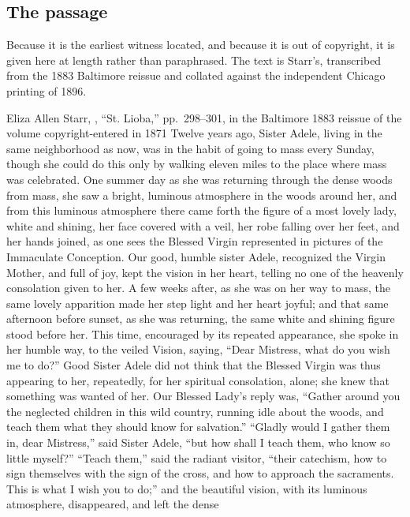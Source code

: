 \subsection{The passage}

Because it is the earliest witness located, and because it is out of
copyright, it is given here at length rather than paraphrased. The text
is Starr's, transcribed from the 1883 Baltimore reissue and collated
against the independent Chicago printing of 1896.

\begin{witnesstext}{Eliza Allen Starr, , ``St.
Lioba,'' pp.~298--301, in the Baltimore 1883 reissue of the volume
copyright-entered in 1871}
Twelve years ago, Sister Adele, living in the same neighborhood as now,
was in the habit of going to mass every Sunday, though she could do
this only by walking eleven miles to the place where mass was
celebrated. One summer day as she was returning through the dense woods
from mass, she saw a bright, luminous atmosphere in the woods around
her, and from this luminous atmosphere there came forth the figure of a
most lovely lady, white and shining, her face covered with a veil, her
robe falling over her feet, and her hands joined, as one sees the
Blessed Virgin represented in pictures of the Immaculate Conception.
Our good, humble sister Adele, recognized the Virgin Mother, and full
of joy, kept the vision in her heart, telling no one of the heavenly
consolation given to her. A few weeks after, as she was on her way to
mass, the same lovely apparition made her step light and her heart
joyful; and that same afternoon before sunset, as she was returning,
the same white and shining figure stood before her. This time,
encouraged by its repeated appearance, she spoke in her humble way, to
the veiled Vision, saying, ``Dear Mistress, what do you wish me to
do?'' Good Sister Adele did not think that the Blessed Virgin was thus
appearing to her, repeatedly, for her spiritual consolation, alone; she
knew that something was wanted of her. Our Blessed Lady's reply was,
``Gather around you the neglected children in this wild country,
running idle about the woods, and teach them what they should know for
salvation.'' ``Gladly would I gather them in, dear Mistress,'' said
Sister Adele, ``but how shall I teach them, who know so little
myself?'' ``Teach them,'' said the radiant visitor, ``their catechism,
how to sign themselves with the sign of the cross, and how to approach
the sacraments. This is what I wish you to do;'' and the beautiful
vision, with its luminous atmosphere, disappeared, and left the dense

\end{witnesstext}
